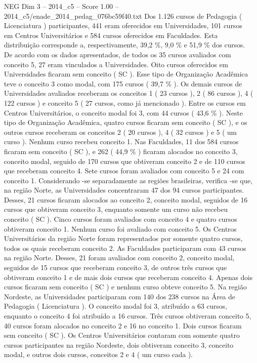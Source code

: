 \begin{textsample}{NEG Dim 3 – 2014\_c5 – Score 1.00 – 2014\_c5/enade\_2014\_pedag\_076bc59f40.txt}
Dos 1.126 cursos de Pedagogia ( Licenciatura ) participantes, 441 eram oferecidos em Universidades, 101 cursos em Centros Universitários e 584 cursos oferecidos em Faculdades.
Esta distribuição corresponde a, respectivamente, 39,2 \%, 9,0 \% e 51,9 \% dos cursos.
De acordo com os dados apresentados, de todos os 35 cursos avaliados com conceito 5, 27 eram vinculados a Universidades.
Oito cursos oferecidos em Universidades ficaram sem conceito ( SC ).
Esse tipo de Organização Acadêmica teve o conceito 3 como modal, com 175 cursos ( 39,7 \% ).
Os demais cursos de Universidades avaliados receberam os conceitos 1 ( 23 cursos ), 2 ( 86 cursos ), 4 ( 122 cursos ) e conceito 5 ( 27 cursos, como já mencionado ).
Entre os cursos em Centros Universitários, o conceito modal foi 3, com 44 cursos ( 43,6 \% ).
Neste tipo de Organização Acadêmica, quatro cursos ficaram sem conceito ( SC ), e os outros cursos receberam os conceitos 2 ( 20 cursos ), 4 ( 32 cursos ) e 5 ( um curso ).
Nenhum curso recebeu conceito 1.
Nas Faculdades, 11 dos 584 cursos ficaram sem conceito ( SC ), e 262 ( 44,9 \% ) ficaram alocados no conceito 3, conceito modal, seguido de 170 cursos que obtiveram conceito 2 e de 110 cursos que receberam conceito 4.
Sete cursos foram avaliados com conceito 5 e 24 com conceito 1.
Considerando -se separadamente as regiões brasileiras, verifica -se que, na região Norte, as Universidades concentraram 47 dos 94 cursos participantes.
Desses, 21 cursos ficaram alocados ao conceito 2, conceito modal, seguidos de 16 cursos que obtiveram conceito 3, enquanto somente um curso não recebeu conceito ( SC ).
Cinco cursos foram avaliados com conceito 4 e quatro cursos obtiveram conceito 1.
Nenhum curso foi avaliado com conceito 5.
Os Centros Universitários da região Norte foram representados por somente quatro cursos, todos os quais receberam conceito 2.
As Faculdades participaram com 43 cursos na região Norte.
Desses, 21 foram avaliados com conceito 2, conceito modal, seguidos de 15 cursos que receberam conceito 3, de outros três cursos que obtiveram conceito 1 e de mais dois cursos que receberam conceito 4.
Apenas dois cursos ficaram sem conceito ( SC ) e nenhum curso obteve conceito 5.
Na região Nordeste, as Universidades participaram com 140 dos 238 cursos na Área de Pedagogia ( Licenciatura ).
O conceito modal foi 3, atribuído a 63 cursos, enquanto o conceito 4 foi atribuído a 16 cursos.
Três cursos obtiveram conceito 5, 40 cursos foram alocados no conceito 2 e 16 no conceito 1.
Dois cursos ficaram sem conceito ( SC ).
Os Centros Universitários contaram com somente quatro cursos participantes na região Nordeste, dois obtiveram conceito 3, conceito modal, e outros dois cursos, conceitos 2 e 4 ( um curso cada ).

\end{textsample}
